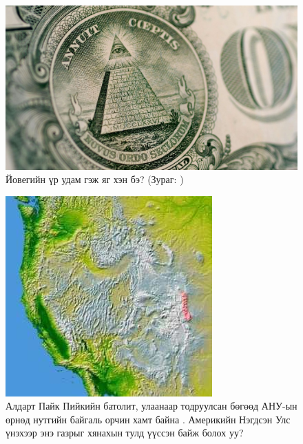 \documentclass[10pt,twocolumn,letterpaper]{article}
\begin{document}
\begin{figure}[t]
\begin{center}
   \includegraphics[width=1\linewidth]{illuminati.jpg}
\end{center}
   \caption{Йовегийн үр удам гэж яг хэн бэ? (Зураг: \cite{35})}
\label{fig:10}
\label{fig:onecol}
\end{figure}

\begin{figure}[t]
\begin{center}
   \includegraphics[width=1\linewidth]{pike.jpg}
\end{center}
   \caption{Алдарт Пайк Пийкийн батолит, улаанаар тодруулсан бөгөөд АНУ-ын өрнөд нутгийн байгаль орчин хамт байна \cite{36}. Америкийн Нэгдсэн Улс үнэхээр энэ газрыг хянахын тулд үүссэн байж болох уу?}
\label{fig:11}
\label{fig:onecol}
\end{figure}
\end{document}

